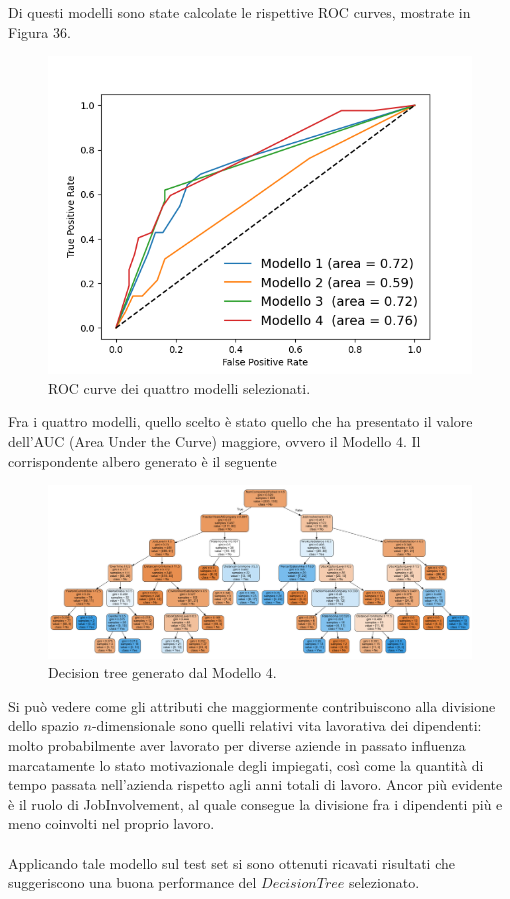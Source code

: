 \documentclass[a4paper,9pt]{article}
\begin{document}
Di questi modelli sono state calcolate le rispettive ROC curves, mostrate in Figura $36$.
\begin{figure}[H]
    \centering
    \includegraphics[scale=0.65]{ROC_CURVE.png}
    \caption{ROC curve dei quattro modelli selezionati.}
    \label{fig:my_label}
\end{figure}
Fra i quattro modelli, quello scelto è stato quello che ha presentato il valore dell'AUC (Area Under the Curve) maggiore, ovvero il Modello 4. Il corrispondente albero generato è il seguente

\begin{figure}[H]
    \centering
    \includegraphics[scale=0.40]{Modello 4 (scelto).png}
    \caption{Decision tree generato dal Modello 4.}
    \label{fig:my_label}
\end{figure}
Si può vedere come gli attributi che maggiormente contribuiscono alla divisione dello spazio $n$-dimensionale sono quelli relativi vita lavorativa dei dipendenti: molto probabilmente aver lavorato per diverse aziende in passato influenza marcatamente lo stato motivazionale degli impiegati, così come la quantità di tempo passata nell'azienda rispetto agli anni totali di lavoro. Ancor più evidente è il ruolo di JobInvolvement, al quale consegue la divisione fra i dipendenti più e meno coinvolti nel proprio lavoro.\\
\\Applicando tale modello sul test set si sono ottenuti ricavati risultati che suggeriscono una buona performance del $Decision Tree$ selezionato.
\end{document}
